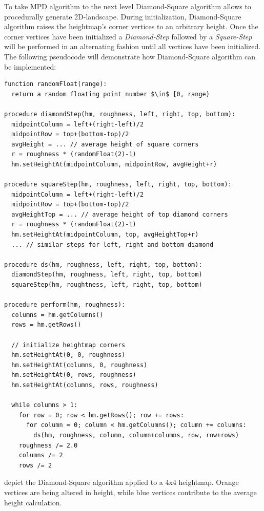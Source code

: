 \documentclass[11pt,a4paper,twoside,openright]{report}
\begin{document}
\noindent To take MPD algorithm to the next level Diamond-Square algorithm allows to procedurally generate 2D-landscape. During initialization, Diamond-Square algorithm raises the heightmap's corner vertices to an arbitrary height. Once the corner vertices have been initialized a \emph{Diamond-Step} followed by a \emph{Square-Step} will be performed in an alternating fashion until all vertices have been initialized. The following pseudocode will demonstrate how Diamond-Square algorithm can be implemented:

\begin{lstlisting}[caption=DS pseudocode, mathescape=true]
function randomFloat(range):
  return a random floating point number $\in$ [0, range)

procedure diamondStep(hm, roughness, left, right, top, bottom):
  midpointColumn = left+(right-left)/2
  midpointRow = top+(bottom-top)/2
  avgHeight = ... // average height of square corners
  r = roughness * (randomFloat(2)-1)
  hm.setHeightAt(midpointColumn, midpointRow, avgHeight+r)

procedure squareStep(hm, roughness, left, right, top, bottom):
  midpointColumn = left+(right-left)/2
  midpointRow = top+(bottom-top)/2
  avgHeightTop = ... // average height of top diamond corners
  r = roughness * (randomFloat(2)-1)
  hm.setHeightAt(midpointColumn, top, avgHeightTop+r)
  ... // similar steps for left, right and bottom diamond

procedure ds(hm, roughness, left, right, top, bottom):
  diamondStep(hm, roughness, left, right, top, bottom)
  squareStep(hm, roughtness, left, right, top, bottom)

procedure perform(hm, roughness):
  columns = hm.getColumns()
  rows = hm.getRows()

  // initialize heightmap corners
  hm.setHeightAt(0, 0, roughness)
  hm.setHeightAt(columns, 0, roughness)
  hm.setHeightAt(0, rows, roughness)
  hm.setHeightAt(columns, rows, roughness)

  while columns > 1:
    for row = 0; row < hm.getRows(); row += rows:
      for column = 0; column < hm.getColumns(); column += columns:
        ds(hm, roughness, column, column+columns, row, row+rows)
    roughness /= 2.0
    columns /= 2
    rows /= 2
\end{lstlisting}

\noindent {} depict the Diamond-Square algorithm applied to a 4x4 heightmap. Orange vertices are being altered in height, while blue vertices contribute to the average height calculation.
\end{document}
